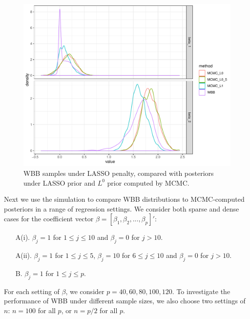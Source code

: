 \documentclass[12pt]{TD-CJS}
\begin{document}
\begin{figure}[!ht]
\centering
\includegraphics[scale=0.55]{mcmc}
\caption{WBB samples under LASSO penalty, compared with posteriors under  LASSO prior and $L^0$ prior computed by MCMC.}
\label{mcmc}
\end{figure}


Next we use the simulation to compare WBB distributions to MCMC-computed posteriors in a range of regression
settings.
We consider both sparse and dense cases for the coefficient vector $\beta = [\beta_1, \beta_2, ..., \beta_p]'$:
\begin{enumerate}
	\item[A(i).] $\beta_j = 1$ for $1 \leq j \leq 10$ and $\beta_j = 0$ for $j > 10$.
	\item[A(ii).] $\beta_j = 1$ for $1 \leq j \leq 5$, $\beta_j = 10$ for $6 \leq j \leq 10$ and $\beta_j = 0$ for $j > 10$.
	\item[B.] $\beta_j = 1$ for $1 \leq j \leq p$.
\end{enumerate}
For each setting of $\beta$, we consider $p = 40, 60, 80, 100, 120$. To investigate the performance of WBB under different sample sizes, we also choose two settings of $n$: $n=100$ for all $p$, or $n=p/2$ for all $p$.
\end{document}
